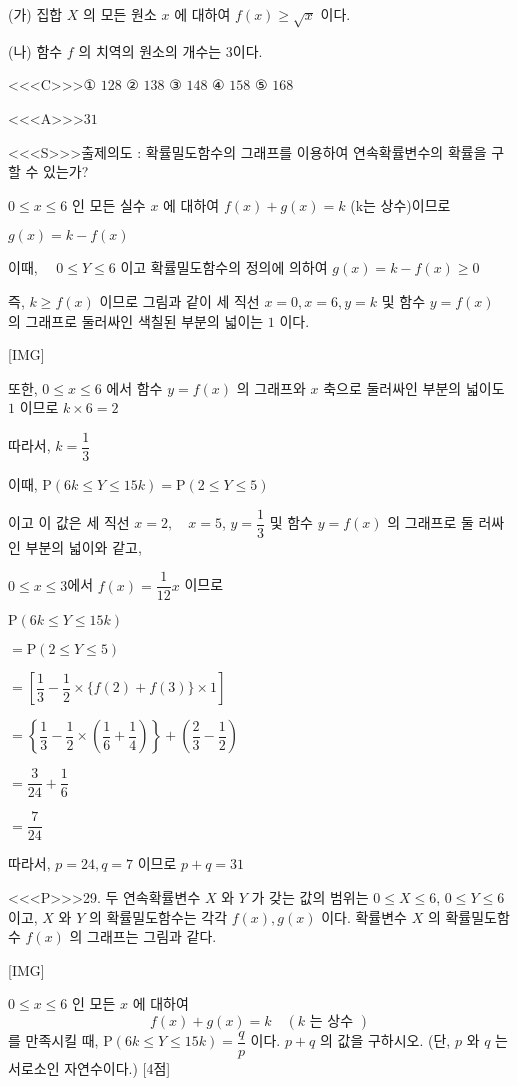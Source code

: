 \documentclass{oblivoir}
\begin{document}
(가) 집합 $X$ 의 모든 원소 $x$ 에 대하여 $f(x) \geq \sqrt{x}$ 이다.

(나) 함수 $f$ 의 치역의 원소의 개수는 $3$이다.

<<<C>>>① $128$
② $138$
③ $148$
④ $158$
⑤ $168$


<<<A>>>$31$

<<<S>>>출제의도 : 확률밀도함수의 그래프를 이용하여 연속확률변수의 확률을 구할 수 있는가?

$0 \leq x \leq 6$ 인 모든 실수 $x$ 에 대하여 $f(x)+g(x)=k$ (k는 상수)이므로

$g(x)=k-f(x)$

이때, $\quad 0 \leq Y \leq 6$ 이고 확률밀도함수의 정의에 의하여 $g(x)=k-f(x) \geq 0$

즉, $k \geq f(x)$ 이므로 그림과 같이 세 직선 $x=0, x=6, y=k$ 및 함수 $y=f(x)$ 의 그래프로 둘러싸인 색칠된 부분의 넓이는 $1$ 이다.

[IMG]

또한, $0 \leq x \leq 6$ 에서 함수 $y=f(x)$ 의 그래프와 $x$ 축으로 둘러싸인 부분의 넓이도 $1$ 이므로
$k \times 6=2$

따라서, $k=\dfrac{1}{3}$

이때, $\mathrm{P}(6 k \leq Y \leq 15 k)=\mathrm{P}(2 \leq Y \leq 5)$

이고 이 값은 세 직선 $x=2, \quad x=5$, $y=\dfrac{1}{3}$ 및 함수 $y=f(x)$ 의 그래프로 둘
러싸인 부분의 넓이와 같고,

$0 \leq x \leq 3$에서 $f(x)=\dfrac{1}{12} x$ 이므로

$\mathrm{P}(6 k \leq Y \leq 15 k)$

$=\mathrm{P}(2 \leq Y \leq 5)$

$=\left[\dfrac{1}{3}-\dfrac{1}{2} \times\{f(2)+f(3)\} \times 1\right]$

$=\left\{\dfrac{1}{3}-\dfrac{1}{2} \times\left(\dfrac{1}{6}+\dfrac{1}{4}\right)\right\}+\left(\dfrac{2}{3}-\dfrac{1}{2}\right)$

$=\dfrac{3}{24}+\dfrac{1}{6}$

$=\dfrac{7}{24}$

따라서, $p=24, q=7$ 이므로 $p+q=31$


<<<P>>>29. 두 연속확률변수 $X$ 와 $Y$ 가 갖는 값의 범위는 $0 \leq X \leq 6$, $0 \leq Y \leq 6$ 이고, $X$ 와 $Y$ 의 확률밀도함수는 각각 $f(x), g(x)$ 이다. 확률변수 $X$ 의 확률밀도함수 $f(x)$ 의 그래프는 그림과 같다.

[IMG]

$0 \leq x \leq 6$ 인 모든 $x$ 에 대하여
$$
f(x)+g(x)=k \quad(k \text { 는 상수 })
$$
를 만족시킬 때, $\mathrm{P}(6 k \leq Y \leq 15 k)=\dfrac{q}{p}$ 이다. $p+q$ 의 값을 구하시오. (단, $p$ 와 $q$ 는 서로소인 자연수이다.) [4점]
\end{document}
